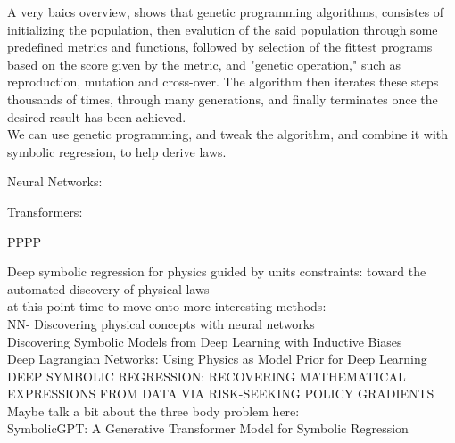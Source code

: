 \documentclass{article}
\begin{document}
A very baics overview, shows that genetic programming algorithms, consistes of initializing the population, then evalution of the said population through some predefined metrics and functions, followed by selection of the fittest programs based on the score given by the metric, and "genetic operation," such as reproduction, mutation and cross-over. The algorithm then iterates these steps thousands of times, through many generations, and finally terminates once the desired result has been achieved.\\

We can use genetic programming, and tweak the algorithm, and combine it with symbolic regression, to help derive laws. \\









\begin{center} 
  {\Large Neural Networks:}
\end{center}


\begin{center} 
  {\Large Transformers:}
\end{center}


PPPP

Deep symbolic regression for physics guided by units constraints:
toward the automated discovery of physical laws\\ 


at this point time to move onto more interesting methods: \\


NN- Discovering physical concepts with neural networks\\ 


Discovering Symbolic Models from Deep Learning
with Inductive Biases\\ 

Deep Lagrangian Networks:
Using Physics as Model Prior for Deep Learning\\ 

DEEP SYMBOLIC REGRESSION:
RECOVERING MATHEMATICAL EXPRESSIONS FROM
DATA VIA RISK-SEEKING POLICY GRADIENTS\\ 

Maybe talk a bit about the three body problem here: \\ 


SymbolicGPT: A Generative Transformer Model for
Symbolic Regression\\ 
\end{document}
